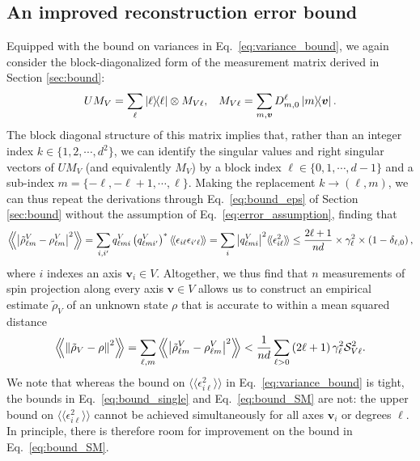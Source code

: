 \documentclass[notitlepage,twocolumn]{revtex4-2}
\newcommand{\f}[2]{\dfrac{#1}{#2}} %
\newcommand{\p}[1]{\left(#1\right)} %
\renewcommand{\v}{\bm} %
\renewcommand{\set}[1]{\{#1\}} %
\newcommand{\bbk}[1]{\langle\!\langle #1 \rangle\!\rangle}
\newcommand{\Bbk}[1]
{\left\langle\!\!\left\langle #1 \right\rangle\!\!\right\rangle}
\renewcommand{\S}{\mathcal{S}}
\begin{document}
\subsection{An improved reconstruction error bound}

Equipped with the bound on variances in Eq.~\eqref{eq:variance_bound}, we again consider the block-diagonalized form of the measurement matrix derived in Section \ref{sec:bound}:
\begin{align}
  U M_V = \sum_\ell \op{\ell} \otimes M_{V\ell},
  &&
  M_{V\ell} = \sum_{m,\v v} D^\ell_{m,0} \op{m}{\v v}.
\end{align}
The block diagonal structure of this matrix implies that, rather than an integer index $k\in\set{1,2,\cdots,d^2}$, we can identify the singular values and right singular vectors of $UM_V$ (and equivalently $M_V$) by a block index $\ell\in\set{0,1,\cdots,d-1}$ and a sub-index $m=\set{-\ell,-\ell+1,\cdots,\ell}$.
Making the replacement $k\to\p{\ell,m}$, we can thus repeat the derivations through Eq.~\eqref{eq:bound_eps} of Section \ref{sec:bound} without the assumption of Eq.~\eqref{eq:error_assumption}, finding that
\begin{align}
  \Bbk{\abs{\tilde\rho_{\ell m}^V-\rho_{\ell m}^V}^2}
  = \sum_{i,i'} q_{\ell m i}^V \p{q_{\ell m i'}^V}^*
  \bbk{\epsilon_{i\ell} \epsilon_{i'\ell}}
  = \sum_i \abs{q_{\ell m i}^V}^2
  \bbk{\epsilon_{i\ell}^2}
  \le \f{2\ell+1}{nd} \times \gamma_\ell^2
  \times \p{1-\delta_{\ell,0}},
  \label{eq:bound_single}
\end{align}
where $i$ indexes an axis $\v v_i\in V$.
Altogether, we thus find that $n$ measurements of spin projection along every axis $\v v\in V$ allows us to construct an empirical estimate $\tilde\rho_V$ of an unknown state $\rho$ that is accurate to within a mean squared distance
\begin{align}
  \Bbk{\norm{\tilde\rho_V-\rho}^2}
  = \sum_{\ell,m} \Bbk{\abs{\tilde\rho_{\ell m}^V-\rho_{\ell m}^V}^2}
  < \f1{nd} \sum_{\ell>0} \p{2\ell+1} \gamma_\ell^2 \S_{V\ell}^2.
  \label{eq:bound_SM}
\end{align}
We note that whereas the bound on $\bbk{\epsilon_{i\ell}^2}$ in Eq.~\eqref{eq:variance_bound} is tight, the bounds in Eq.~\eqref{eq:bound_single} and Eq.~\eqref{eq:bound_SM} are not: the upper bound on $\bbk{\epsilon_{i\ell}^2}$ cannot be achieved simultaneously for all axes $\v v_i$ or degrees $\ell$.
In principle, there is therefore room for improvement on the bound in Eq.~\eqref{eq:bound_SM}.
\end{document}
